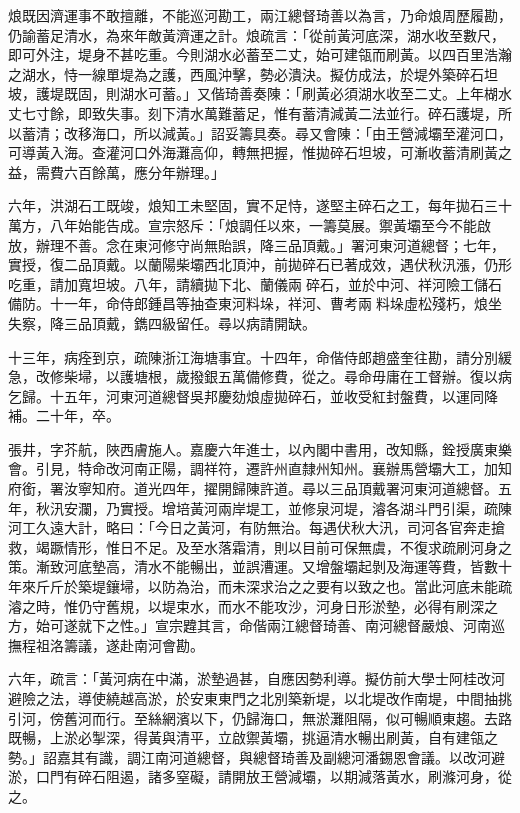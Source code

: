 \begin{pinyinscope}
烺既因濟運事不敢擅離，不能巡河勘工，兩江總督琦善以為言，乃命烺周歷履勘，仍諭蓄足清水，為來年敵黃濟運之計。烺疏言：「從前黃河底深，湖水收至數尺，即可外注，堤身不甚吃重。今則湖水必蓄至二丈，始可建瓴而刷黃。以四百里浩瀚之湖水，恃一線單堤為之護，西風沖擊，勢必潰決。擬仿成法，於堤外築碎石坦坡，護堤既固，則湖水可蓄。」又偕琦善奏陳：「刷黃必須湖水收至二丈。上年楜水丈七寸餘，即致失事。刻下清水萬難蓄足，惟有蓄清減黃二法並行。碎石護堤，所以蓄清；改移海口，所以減黃。」詔妥籌具奏。尋又會陳：「由王營減壩至灌河口，可導黃入海。查灌河口外海灘高仰，轉無把握，惟拋碎石坦坡，可漸收蓄清刷黃之益，需費六百餘萬，應分年辦理。」

六年，洪湖石工既竣，烺知工未堅固，實不足恃，遂堅主碎石之工，每年拋石三十萬方，八年始能告成。宣宗怒斥：「烺調任以來，一籌莫展。禦黃壩至今不能啟放，辦理不善。念在東河修守尚無貽誤，降三品頂戴。」署河東河道總督；七年，實授，復二品頂戴。以蘭陽柴壩西北頂沖，前拋碎石已著成效，遇伏秋汛漲，仍形吃重，請加寬坦坡。八年，請續拋下北、蘭儀兩碎石，並於中河、祥河險工儲石備防。十一年，命侍郎鍾昌等抽查東河料垛，祥河、曹考兩料垛虛松殘朽，烺坐失察，降三品頂戴，鐫四級留任。尋以病請開缺。

十三年，病痊到京，疏陳浙江海塘事宜。十四年，命偕侍郎趙盛奎往勘，請分別緩急，改修柴埽，以護塘根，歲撥銀五萬備修費，從之。尋命毋庸在工督辦。復以病乞歸。十五年，河東河道總督吳邦慶劾烺虛拋碎石，並收受紅封盤費，以運同降補。二十年，卒。

張井，字芥航，陜西膚施人。嘉慶六年進士，以內閣中書用，改知縣，銓授廣東樂會。引見，特命改河南正陽，調祥符，遷許州直隸州知州。襄辦馬營壩大工，加知府銜，署汝寧知府。道光四年，擢開歸陳許道。尋以三品頂戴署河東河道總督。五年，秋汛安瀾，乃實授。增培黃河兩岸堤工，並修泉河堤，濬各湖斗門引渠，疏陳河工久遠大計，略曰：「今日之黃河，有防無治。每遇伏秋大汛，司河各官奔走搶救，竭蹶情形，惟日不足。及至水落霜清，則以目前可保無虞，不復求疏刷河身之策。漸致河底墊高，清水不能暢出，並誤漕運。又增盤壩起剝及海運等費，皆數十年來斤斤於築堤鑲埽，以防為治，而未深求治之之要有以致之也。當此河底未能疏濬之時，惟仍守舊規，以堤束水，而水不能攻沙，河身日形淤墊，必得有刷深之方，始可遂就下之性。」宣宗韙其言，命偕兩江總督琦善、南河總督嚴烺、河南巡撫程祖洛籌議，遂赴南河會勘。

六年，疏言：「黃河病在中滿，淤墊過甚，自應因勢利導。擬仿前大學士阿桂改河避險之法，導使繞越高淤，於安東東門之北別築新堤，以北堤改作南堤，中間抽挑引河，傍舊河而行。至絲網濱以下，仍歸海口，無淤灘阻隔，似可暢順東趨。去路既暢，上淤必掣深，得黃與清平，立啟禦黃壩，挑逼清水暢出刷黃，自有建瓴之勢。」詔嘉其有識，調江南河道總督，與總督琦善及副總河潘錫恩會議。以改河避淤，口門有碎石阻遏，諸多窒礙，請開放王營減壩，以期減落黃水，刷滌河身，從之。


\end{pinyinscope}
